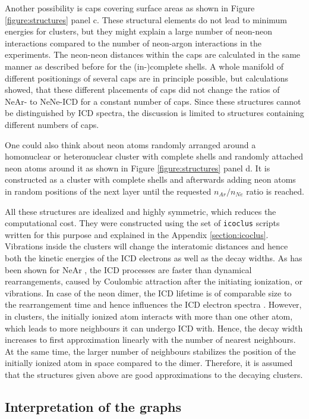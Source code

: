 Another possibility is caps covering surface areas as shown
in Figure \ref{figure:structures} panel c. These structural elements
do not lead to minimum energies for clusters, but they might explain a
large number of neon-neon interactions compared to the number of
neon-argon interactions in the experiments.
The neon-neon distances within the caps are
calculated in the same
manner as described before for the (in-)complete shells.
A whole manifold of different positionings of several caps are in principle
possible, but calculations showed, that these different
placements of caps did not change the ratios of NeAr- to NeNe-ICD for a
constant number of caps. Since these structures cannot be distinguished
by ICD spectra, the
discussion is limited to structures containing different numbers of caps.

One could also think about neon atoms randomly arranged around a homonuclear
or heteronuclear cluster with complete shells and randomly attached neon
atoms around it as shown in Figure \ref{figure:structures} panel d.
It is constructed as a cluster with complete shells and afterwards adding
neon atoms in random positions of the next layer until the requested
$n_{Ar}/n_{Ne}$ ratio is reached.

All these structures are idealized and highly symmetric, which reduces
the computational cost. They were constructed using the set of \verb|icoclus|
scripts written for this purpose and explained in the
Appendix \ref{section:icoclus}.
Vibrations inside the clusters will change the interatomic
distances and hence both the kinetic energies of the ICD electrons as well as
the decay widths. As has been shown for NeAr \cite{Scheit06}, the ICD processes
are faster than dynamical rearrangements, caused by Coulombic attraction
after the initiating ionization, or vibrations. In case of the neon dimer, the
ICD lifetime is of comparable size to the rearrangement time and hence
influences the ICD electron spectra \cite{Scheit03}. However, in clusters, the
initially ionized atom interacts with more than one other atom, which leads
to more neighbours it can undergo ICD with. Hence, the decay width increases
to first approximation linearly with the number of nearest neighbours.
At the same time, the larger number of neighbours stabilizes the position
of the initially ionized atom in space compared to the dimer.
Therefore, it is assumed that the structures given above are good
approximations to the decaying clusters.




\subsection{Interpretation of the graphs}


